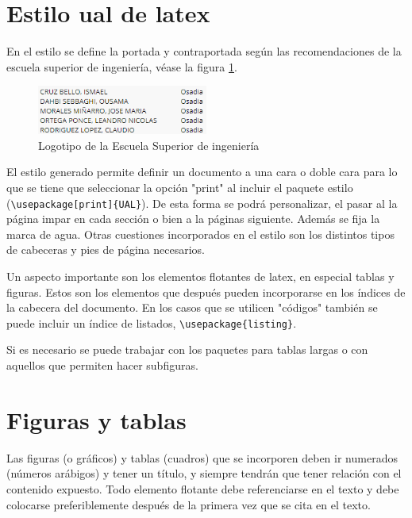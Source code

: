 \section {Estilo ual de latex}

En el estilo se define la portada y contraportada según las recomendaciones de la escuela superior de ingeniería, véase la figura \ref{fig:facultad}.

\begin{figure}
	\begin{center}
		\includegraphics[width = 0.5\textwidth]{Capturas/Equipo.PNG}
	\end{center}
	\caption{\label{fig:facultad} Logotipo de la Escuela Superior de ingeniería }
\end{figure}



El estilo generado permite definir un documento a una cara o doble cara para lo que se tiene que seleccionar la opción "print" al incluir el paquete estilo (\lstinline[language=enparrafo]!\usepackage[print]{UAL}!). De esta forma se podrá personalizar, el pasar al la página impar en cada sección o bien a la páginas siguiente. %
Además se fija la marca de agua. Otras cuestiones incorporados en el estilo son los distintos tipos de cabeceras y pies de página necesarios.

Un aspecto importante son los elementos flotantes de latex, en especial tablas y figuras. Estos son los elementos que después pueden incorporarse en los índices de la cabecera del documento. En los casos que se utilicen "códigos" también se puede incluir un índice de listados, \lstinline[language=enparrafo]!\usepackage{listing}!.

Si es necesario se puede trabajar con los paquetes para tablas largas o con aquellos que permiten hacer subfiguras.

 \section{Figuras y tablas}

Las  figuras  (o  gráficos)  y  tablas  (cuadros)  que  se  incorporen  deben  ir  numerados  (números  arábigos)  y  tener  un  título,  y  siempre  tendrán  que  tener  relación  con el contenido expuesto.  Todo elemento flotante debe referenciarse en el texto y debe colocarse  preferiblemente después de la primera vez que se cita en el texto.

